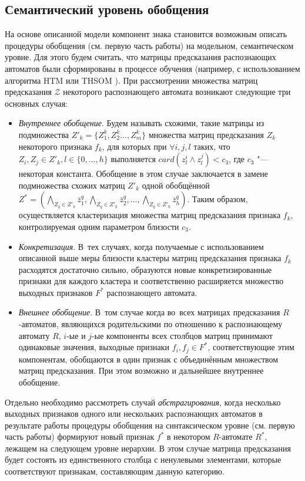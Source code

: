 \documentclass[a4paper, 12pt]{article}
\theoremstyle{plain}
\begin{document}
	\subsection{Семантический уровень обобщения} На основе описанной модели компонент знака становится возможным описать процедуры обобщения (см. первую часть работы) на модельном, семантическом уровне. Для этого будем считать, что матрицы предсказания распознающих автоматов были сформированы в процессе обучения (например, с использованием алгоритма HTM \cite{Hawkins2009} или THSOM \cite{Koutn2008}). При рассмотрении множества матриц предсказания $\mathcal Z$ некоторого распознающего автомата возникают следующие три основных случая:
	\begin{itemize}
		\item \textit{Внутреннее обобщение}. Будем называть схожими, такие матрицы из подмножества $Z'_k=\{Z_1^k,Z_2^k\dots,Z_m^k\}$ множества матриц предсказания $Z_k$ некоторого признака $f_k$, для которых при $\forall i,j,l$ таких, что $Z_i,Z_j\in Z'_k,l\in\{0,\dots,h\}$ выполняется $card(z_l^i\wedge z_l^j)<c_3$, где $c_3$ "--- некоторая константа. Обобщение в этом случае заключается в замене подмножества схожих матриц $Z'_k$ одной обобщённой $Z^*=(\bigwedge\limits_{Z_q\in Z'_k}\bar z_1^q,\bigwedge\limits_{Z_q\in Z'_k}\bar z_2^q,\dots,\bigwedge\limits_{Z_q\in Z'_k}\bar z_h^q)$. Таким образом, осуществляется кластеризация множества матриц предсказания признака $f_k$, контролируемая одним параметром близости $c_3$.
		\item \textit{Конкретизация}. В~тех случаях, когда получаемые с использованием описанной выше меры близости кластеры матриц предсказания признака $f_k$ расходятся достаточно сильно, образуются новые конкретизированные признаки для каждого кластера и соответственно расширяется множество выходных признаков $F^*$ распознающего автомата.
		\item \textit{Внешнее обобщение}. В~том случае когда во~всех матрицах предсказания $R$-автоматов, являющихся родительскими по отношению к распознающему автомату $R$, $i$-ые и $j$-ые компоненты всех столбцов матриц принимают одинаковые значения, выходные признаки $f_i,f_j\in F^*$, соответствующие этим компонентам, обобщаются в один признак с объединённым множеством матриц предсказания. При этом возможно и дальнейшее внутреннее обобщение.
	\end{itemize}
	
	Отдельно необходимо рассмотреть случай \textit{абстрагирования}, когда несколько выходных признаков одного или нескольких распознающих автоматов в результате работы процедуры обобщения на синтаксическом уровне (см. первую часть работы) формируют новый признак $f^*$ в некотором $R$-автомате $R^*$, лежащем на следующем уровне иерархии. В этом случае матрица предсказания будет состоять из единственного столбца с ненулевыми элементами, которые соответствуют признакам, составляющим данную категорию.
	
\end{document}
